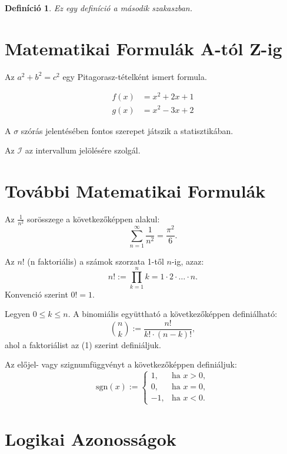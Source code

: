 \documentclass[a4paper,12pt]{article}
\newtheorem{definition}{Definíció}[section]
\begin{document}
\begin{definition}
Ez egy definíció a második szakaszban.
\end{definition}

\section{Matematikai Formulák A-tól Z-ig}

Az \( a^2 + b^2 = c^2 \) egy Pitagorasz-tételként ismert formula.

\begin{align}
    f(x) &= x^2 + 2x + 1 \\
    g(x) &= x^2 - 3x + 2
\end{align}

A \(\sigma\) szórás jelentésében fontos szerepet játszik a statisztikában.

Az \(\mathcal{I}\) az intervallum jelölésére szolgál.

\section{További Matematikai Formulák}

Az \( \frac{1}{n^2} \) sorösszege a következőképpen alakul:
\[
\sum_{n=1}^{\infty} \frac{1}{n^2} = \frac{\pi^2}{6}.
\]

Az \( n! \) (n faktoriális) a számok szorzata 1-től \( n \)-ig, azaz:
\[
n! := \prod_{k=1}^{n} k = 1 \cdot 2 \cdot \dots \cdot n. \tag{1}
\]
Konvenció szerint \( 0! = 1 \).

Legyen \( 0 \leq k \leq n \). A binomiális együttható a következőképpen definiálható:
\[
\binom{n}{k} := \frac{n!}{k! \cdot (n - k)!},
\]
ahol a faktoriálist az (1) szerint definiáljuk.

Az előjel- vagy szignumfüggvényt a következőképpen definiáljuk:
\[
\text{sgn}(x) :=
\begin{cases}
    1, & \text{ha } x > 0, \\
    0, & \text{ha } x = 0, \\
   -1, & \text{ha } x < 0.
\end{cases}
\]

\section{Logikai Azonosságok}
\end{document}

